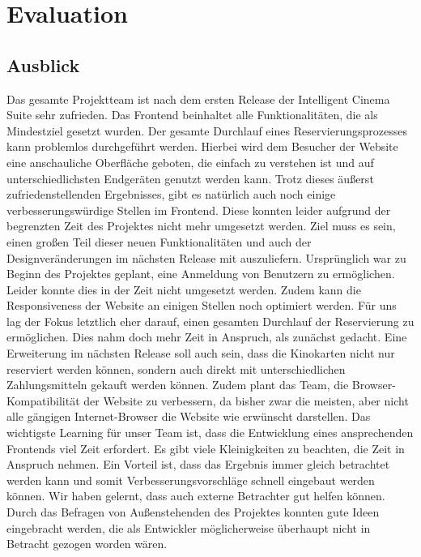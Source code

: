 \chapter{Evaluation} \label{Evaluation}
	
	\section{Ausblick}
		Das gesamte Projektteam ist nach dem ersten Release der Intelligent Cinema Suite sehr zufrieden. Das Frontend beinhaltet alle Funktionalitäten, die als Mindestziel gesetzt wurden. Der gesamte Durchlauf eines Reservierungsprozesses kann problemlos durchgeführt werden. Hierbei wird dem Besucher der Website eine anschauliche Oberfläche geboten, die einfach zu verstehen ist und auf unterschiedlichsten Endgeräten genutzt werden kann. Trotz dieses äußerst zufriedenstellenden Ergebnisses, gibt es natürlich auch noch einige verbesserungswürdige Stellen im Frontend. Diese konnten leider aufgrund der begrenzten Zeit des Projektes nicht mehr umgesetzt werden. Ziel muss es sein, einen großen Teil dieser neuen Funktionalitäten und auch der Designveränderungen im nächsten Release mit auszuliefern. Ursprünglich war zu Beginn des Projektes geplant, eine Anmeldung von Benutzern zu ermöglichen. Leider konnte dies in der Zeit nicht umgesetzt werden. Zudem kann die Responsiveness der Website an einigen Stellen noch optimiert werden. Für uns lag der Fokus letztlich eher darauf, einen gesamten Durchlauf der Reservierung zu ermöglichen. Dies nahm doch mehr Zeit in Anspruch, als zunächst gedacht. Eine Erweiterung im nächsten Release soll auch sein, dass die Kinokarten nicht nur reserviert werden können, sondern auch direkt mit unterschiedlichen Zahlungsmitteln gekauft werden können. Zudem plant das Team, die Browser-Kompatibilität der Website zu verbessern, da bisher zwar die meisten, aber nicht alle gängigen Internet-Browser die Website wie erwünscht darstellen. Das wichtigste Learning für unser Team ist, dass die Entwicklung eines ansprechenden Frontends viel Zeit erfordert. Es gibt viele Kleinigkeiten zu beachten, die Zeit in Anspruch nehmen. Ein Vorteil ist, dass das Ergebnis immer gleich betrachtet werden kann und somit Verbesserungsvorschläge schnell eingebaut werden können. Wir haben gelernt, dass auch externe Betrachter gut helfen können. Durch das Befragen von Außenstehenden des Projektes konnten gute Ideen eingebracht werden, die als Entwickler möglicherweise überhaupt nicht in Betracht gezogen worden wären.
	
